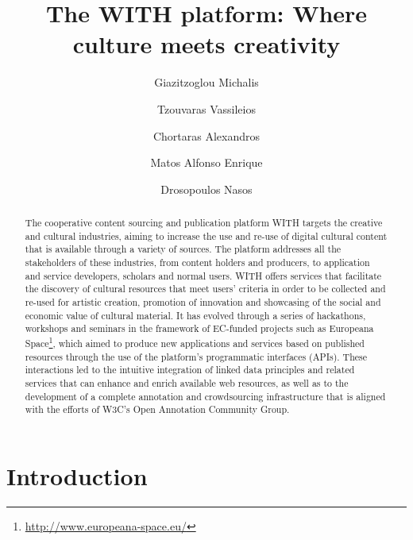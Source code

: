 \documentclass[runningheads,a4paper]{llncs}
\begin{document}
\mainmatter

\title{The WITH platform: Where culture meets creativity}
\author{Giazitzoglou Michalis \and
Tzouvaras Vassileios \and
Chortaras Alexandros \and
Matos Alfonso Enrique \and
Drosopoulos Nasos}
\maketitle

\begin{abstract}
The cooperative content sourcing and publication platform WITH targets the creative and cultural industries, aiming to increase the use and re-use of digital cultural content that is available through a variety of sources. The platform addresses all the stakeholders of these industries, from content holders and producers, to application and service developers, scholars and normal users. WITH offers services that facilitate the discovery of cultural resources that meet users' criteria in order to be collected and re-used for artistic creation, promotion of innovation and showcasing of the social and economic value of cultural material. It has evolved through a series of hackathons, workshops and seminars in the framework of EC-funded projects such as Europeana Space\footnote{\url{http://www.europeana-space.eu/}}, which aimed to produce new applications and services based on published resources through the use of the platform's programmatic interfaces (APIs). These interactions led to the intuitive integration of linked data principles and related services that can enhance and enrich available web resources, as well as to the development of a complete annotation and crowdsourcing infrastructure that is aligned with the efforts of W3C's Open Annotation Community Group.

\end{abstract}


\section{Introduction}
\end{document}
